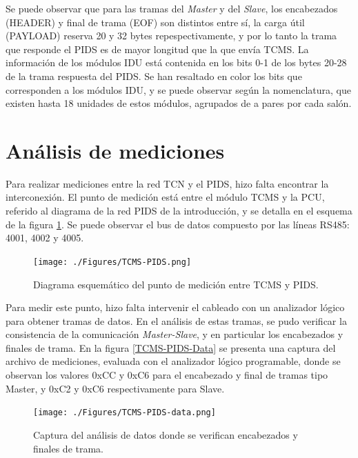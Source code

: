 Se puede observar que para las tramas del \textit{Master} y del \textit{Slave}, los encabezados (HEADER) y final de trama (EOF) son distintos entre sí, la carga útil (PAYLOAD) reserva 20 y 32 bytes repespectivamente, y por lo tanto la trama que responde el PIDS es de mayor longitud que la que envía TCMS. La información de los módulos IDU está contenida en los bits 0-1 de los bytes 20-28 de la trama respuesta del PIDS. Se han resaltado en color los bits que corresponden a los módulos IDU, y se puede observar según la nomenclatura, que existen hasta 18 unidades de estos módulos, agrupados de a pares por cada salón. \\


\section{Análisis de mediciones}

Para realizar mediciones entre la red TCN y el PIDS, hizo falta encontrar la interconexión. El punto de medición está entre el módulo TCMS y la PCU, referido al diagrama de la red PIDS de la introducción, y se detalla en el esquema de la figura \ref{fig:TCMS-PIDS}. Se puede observar el bus de datos compuesto por las líneas RS485: 4001, 4002 y 4005.\\

\begin{figure}[H]
	\centering
	\texttt{[image: ./Figures/TCMS-PIDS.png]}
	\caption{Diagrama esquemático del punto de medición entre TCMS y PIDS.}
	\label{fig:TCMS-PIDS}
\end{figure}

Para medir este punto, hizo falta intervenir el cableado con un analizador lógico para obtener tramas de datos. En el análisis de estas tramas, se pudo verificar la consistencia de la comunicación \textit{Master-Slave}, y en particular los encabezados y finales de trama. En la figura \ref{TCMS-PIDS-Data} se presenta una captura del archivo de mediciones, evaluada con el analizador lógico programable, donde se observan los valores  0xCC y 0xC6 para el encabezado y final de tramas tipo Master, y 0xC2 y 0xC6 respectivamente para Slave. \\

\begin{figure}[H]
	\centering
	\texttt{[image: ./Figures/TCMS-PIDS-data.png]}
	\caption{Captura del análisis de datos donde se verifican encabezados y finales de trama.}
	\label{fig:TCMS-PIDS-Data}
\end{figure}

